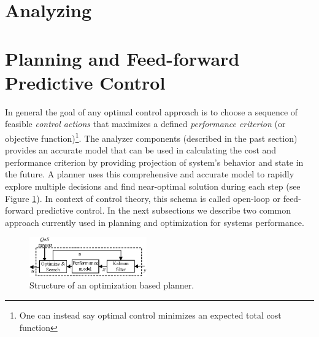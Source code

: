 \section{Analyzing} 
 


\section{Planning and Feed-forward Predictive Control} 
 \label{sec:optimizers} 
In general the goal of any optimal control approach is to choose a sequence of feasible \textit{control actions} that maximizes a defined \textit{performance criterion} (or objective function)\footnote{One can instead say optimal control minimizes an expected total cost function}. %
The analyzer components (described in the past section) provides an accurate model that can be used 
in calculating the cost and performance criterion by providing projection of system's behavior and state in the future. 
A planner uses this comprehensive and accurate model to rapidly explore multiple decisions and find near-optimal solution during each  step \cite{litoiu_hierarchical_2005,aiber2004autonomic} (see Figure \ref{fig:optimization-based-planner}). 
In context of control theory, this schema is called open-loop or feed-forward predictive control. 
In the next subsections we describe two common approach currently used in planning and optimization for systems performance. 
\begin{figure}[h]
	\centering
	\includegraphics[width=0.45\textwidth]{image/loop/controller-optimizer.eps}
	\caption{Structure of an optimization based planner.}  %
	\label{fig:optimization-based-planner}
\end{figure}
 

